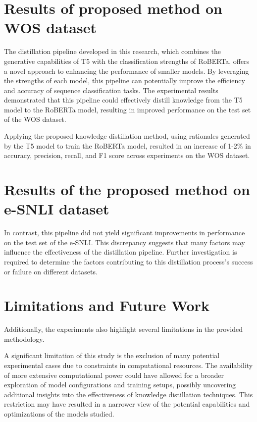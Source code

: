 \section{Results of proposed method on WOS dataset}

The distillation pipeline developed in this research, which combines the generative capabilities of T5 with the classification strengths of RoBERTa, offers a novel approach to enhancing the performance of smaller models. By leveraging the strengths of each model, this pipeline can potentially improve the efficiency and accuracy of sequence classification tasks. The experimental results demonstrated that this pipeline could effectively distill knowledge from the T5 model to the RoBERTa model, resulting in improved performance on the test set of the WOS dataset.

Applying the proposed knowledge distillation method, using rationales generated by the T5 model to train the RoBERTa model, resulted in an increase of 1-2\% in accuracy, precision, recall, and F1 score across experiments on the WOS dataset.

\section{Results of the proposed method on e-SNLI dataset}

In contrast, this pipeline did not yield significant improvements in performance on the test set of the e-SNLI\@. This discrepancy suggests that many factors may influence the effectiveness of the distillation pipeline. Further investigation is required to determine the factors contributing to this distillation process's success or failure on different datasets.

\section{Limitations and Future Work}

Additionally, the experiments also highlight several limitations in the provided methodology. 

A significant limitation of this study is the exclusion of many potential experimental cases due to constraints in computational resources. The availability of more extensive computational power could have allowed for a broader exploration of model configurations and training setups, possibly uncovering additional insights into the effectiveness of knowledge distillation techniques. This restriction may have resulted in a narrower view of the potential capabilities and optimizations of the models studied.

